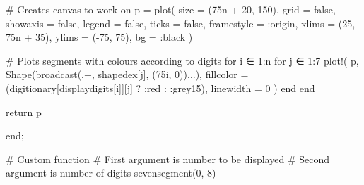 \documentclass[
  letterpaper,
  DIV=11,
  numbers=noendperiod]{scrreprt}
\newenvironment{Shaded}{\begin{snugshade}}{\end{snugshade}}
\newcommand{\CommentTok}[1]{\textcolor[rgb]{0.37,0.37,0.37}{#1}}
\newcommand{\ConstantTok}[1]{\textcolor[rgb]{0.56,0.35,0.01}{#1}}
\newcommand{\ControlFlowTok}[1]{\textcolor[rgb]{0.00,0.23,0.31}{#1}}
\newcommand{\FloatTok}[1]{\textcolor[rgb]{0.68,0.00,0.00}{#1}}
\newcommand{\FunctionTok}[1]{\textcolor[rgb]{0.28,0.35,0.67}{#1}}
\newcommand{\KeywordTok}[1]{\textcolor[rgb]{0.00,0.23,0.31}{#1}}
\newcommand{\NormalTok}[1]{\textcolor[rgb]{0.00,0.23,0.31}{#1}}
\newcommand{\OperatorTok}[1]{\textcolor[rgb]{0.37,0.37,0.37}{#1}}
\begin{document}
\begin{Shaded}
\begin{Highlighting}[]
    \CommentTok{\# Creates canvas to work on}
\NormalTok{    p }\OperatorTok{=} \FunctionTok{plot}\NormalTok{(}
\NormalTok{        size }\OperatorTok{=}\NormalTok{ (}\FloatTok{75}\NormalTok{n }\OperatorTok{+} \FloatTok{20}\NormalTok{, }\FloatTok{150}\NormalTok{),}
\NormalTok{        grid }\OperatorTok{=} \ConstantTok{false}\NormalTok{,}
\NormalTok{        showaxis }\OperatorTok{=} \ConstantTok{false}\NormalTok{,}
\NormalTok{        legend }\OperatorTok{=} \ConstantTok{false}\NormalTok{,}
\NormalTok{        ticks }\OperatorTok{=} \ConstantTok{false}\NormalTok{,}
\NormalTok{        framestyle }\OperatorTok{=} \OperatorTok{:}\NormalTok{origin,}
\NormalTok{        xlims }\OperatorTok{=}\NormalTok{ (}\FloatTok{25}\NormalTok{, }\FloatTok{75}\NormalTok{n }\OperatorTok{+} \FloatTok{35}\NormalTok{),}
\NormalTok{        ylims }\OperatorTok{=}\NormalTok{ (}\OperatorTok{{-}}\FloatTok{75}\NormalTok{, }\FloatTok{75}\NormalTok{),}
\NormalTok{        bg }\OperatorTok{=} \OperatorTok{:}\NormalTok{black}
\NormalTok{    )}

    \CommentTok{\# Plots segments with colours according to digits}
    \ControlFlowTok{for}\NormalTok{ i }\OperatorTok{∈} \FloatTok{1}\OperatorTok{:}\NormalTok{n}
        \ControlFlowTok{for}\NormalTok{ j }\OperatorTok{∈} \FloatTok{1}\OperatorTok{:}\FloatTok{7}
            \FunctionTok{plot!}\NormalTok{(}
\NormalTok{                p,}
                \FunctionTok{Shape}\NormalTok{(}\FunctionTok{broadcast}\NormalTok{(}\OperatorTok{.+}\NormalTok{, shapedex[j], (}\FloatTok{75}\NormalTok{i, }\FloatTok{0}\NormalTok{))}\OperatorTok{...}\NormalTok{),}
\NormalTok{                fillcolor }\OperatorTok{=}\NormalTok{ (digitionary[displaydigits[i]][j] ? }\OperatorTok{:}\NormalTok{red }\OperatorTok{:} \OperatorTok{:}\NormalTok{grey15),}
\NormalTok{                linewidth }\OperatorTok{=} \FloatTok{0}
\NormalTok{            )}
        \ControlFlowTok{end}
    \ControlFlowTok{end}

    \ControlFlowTok{return}\NormalTok{ p}
    
\KeywordTok{end}\NormalTok{;}
\end{Highlighting}
\end{Shaded}

\begin{Shaded}
\begin{Highlighting}[]
\CommentTok{\# Custom function}
\CommentTok{\# First argument is number to be displayed}
\CommentTok{\# Second argument is number of digits}
\FunctionTok{sevensegment}\NormalTok{(}\FloatTok{0}\NormalTok{, }\FloatTok{8}\NormalTok{)}
\end{Highlighting}
\end{Shaded}
\end{document}
